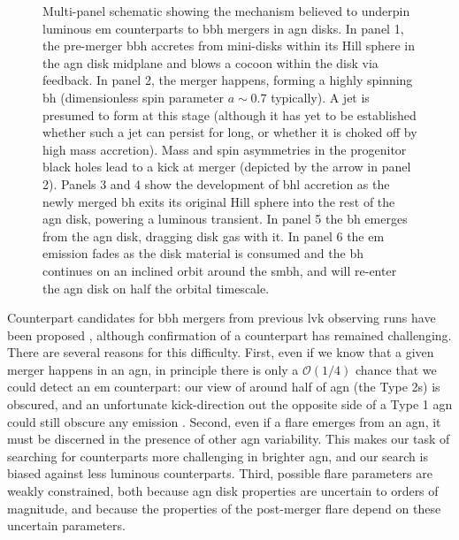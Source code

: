 \documentclass[twocolumn]{aastex631}
\begin{document}
\begin{figure}
    \centering
    \caption{
         Multi-panel schematic showing the mechanism believed to underpin luminous \gls{em} counterparts to \gls{bbh} mergers in \gls{agn} disks.
         In panel 1, the pre-merger \gls{bbh} accretes from mini-disks within its Hill sphere in the \gls{agn} disk midplane and blows a cocoon within the disk via feedback.
        In panel 2, the merger happens, forming a highly spinning \gls{bh} (dimensionless spin parameter $a \sim 0.7$ typically).
        A jet is presumed to form at this stage (although it has yet to be established whether such a jet can persist for long, or whether it is choked off by high mass accretion).
        Mass and spin asymmetries in the progenitor black holes lead to a kick at merger (depicted by the arrow in panel 2).
        Panels 3 and 4 show the development of \gls{bhl} accretion as the newly merged \gls{bh} exits its original Hill sphere into the rest of the \gls{agn} disk, powering a luminous transient.
        In panel 5 the \gls{bh} emerges from the \gls{agn} disk, dragging disk gas with it.
        In panel 6 the \gls{em} emission fades as the disk material is consumed and the \gls{bh} continues on an inclined orbit around the \gls{smbh}, and will re-enter the \gls{agn} disk on half the orbital timescale.
    }
    \label{fig:model}
\end{figure}

Counterpart candidates for \gls{bbh} mergers from previous \gls{lvk} observing runs have been proposed \citep{grahamCandidateElectromagneticCounterpart2020, grahamLightDarkSearching2023}, although confirmation of a counterpart has remained challenging.
There are several reasons for this difficulty.
First, even if we know that a given merger happens in an \gls{agn}, in principle there is only a $\mathcal{O}(1/4)$ chance that we could detect an \gls{em} counterpart: our view of around half of \gls{agn} (the Type 2s) is obscured, and an unfortunate kick-direction out the opposite side of a Type 1 \gls{agn} could still obscure any emission \citep{grahamLightDarkSearching2023}.
Second, even if a flare emerges from an \gls{agn}, it must be discerned in the presence of other \gls{agn} variability.
This makes our task of searching for counterparts more challenging in brighter \gls{agn}, and our search is biased against less luminous counterparts.
Third, possible flare parameters are weakly constrained, both because \gls{agn} disk properties are uncertain to orders of magnitude, and because the properties of the post-merger flare depend on these uncertain parameters.
\end{document}
